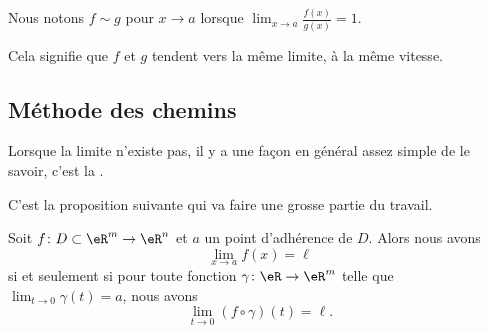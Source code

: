 \begin{normaltext}
	Nous notons \( f\sim g\) pour \( x\to a\) lorsque \( \lim_{x\to a} \frac{ f(x) }{ g(x) }=1\).

	Cela signifie que \( f\) et \( g\) tendent vers la même limite, à la même vitesse.
\end{normaltext}

\subsection{Méthode des chemins}

Lorsque la limite n'existe pas, il y a une façon en général assez simple de le savoir, c'est la .

\newcommand{\CaptionFigMethodeChemin}{Sur toute la droite \( y=-x\), la fonction vaut \( -1/2\), tandis que sur toute la droite \( y=x/2\), elle vaut \( \frac{2}{ 5 }\). Il est donc impossible que la fonction ait une limite en \( (0,0)\), parce que dans toute boule autour de zéro, il y aura toujours un point de chacune de ces deux droites.}


C'est la proposition suivante qui va faire une grosse partie du travail.
\begin{proposition}     \label{PROPooSAFIooWvmSiT}
	Soit \( f\colon D\subset\eR^m\to \eR^n\) et \( a\) un point d'adhérence de \( D\). Alors nous avons
	\begin{equation}
		\lim_{x\to a} f(x)=\ell
	\end{equation}
	si et seulement si pour toute fonction \( \gamma\colon \eR\to \eR^m\) telle que \( \lim_{t\to 0} \gamma(t)=a\), nous avons
	\begin{equation}
		\lim_{t\to 0} (f\circ\gamma)(t)=\ell.
	\end{equation}
\end{proposition}

